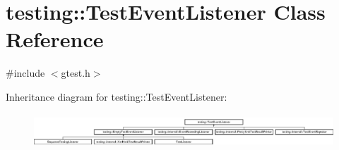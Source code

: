 \hypertarget{classtesting_1_1_test_event_listener}{}\section{testing\+:\+:Test\+Event\+Listener Class Reference}
\label{classtesting_1_1_test_event_listener}


{\ttfamily \#include $<$gtest.\+h$>$}

Inheritance diagram for testing\+:\+:Test\+Event\+Listener\+:\begin{figure}[H]
\begin{center}
\leavevmode
\includegraphics[height=1.297297cm]{classtesting_1_1_test_event_listener}
\end{center}
\end{figure}
